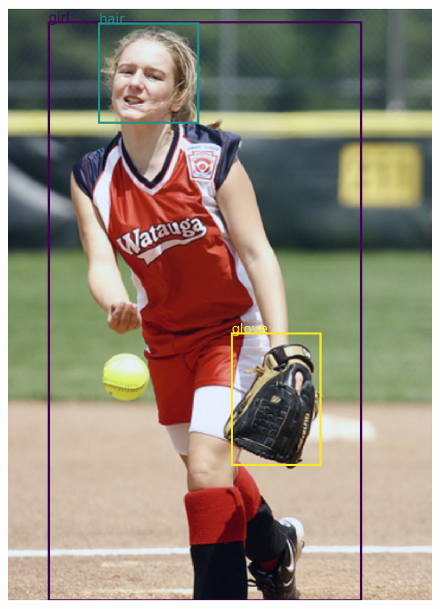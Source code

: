 \begin{figure}[h!]
{\begin{minipage}[t]{6cm}
			\includegraphics[width=0.86\linewidth]{figures/result/relation_Attention/img2}
	\end{minipage}}
	

\end{figure}
